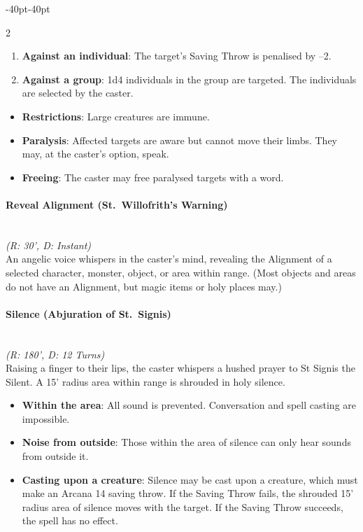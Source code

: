 \documentclass{book}
\providecommand{\tightlist}{%
\setlength{\itemsep}{0pt}\setlength{\parskip}{0pt}}
\begin{document}
\begin{adjustwidth}{-40pt}{-40pt}
\begin{multicols}{2}
\begin{enumerate}
	\def\labelenumi{\arabic{enumi}.}
	\tightlist
	\item
	\textbf{Against an individual}: The target's Saving Throw is penalised
	by --2.
	\item
	\textbf{Against a group}: 1d4 individuals in the group are targeted.
	The individuals are selected by the caster.
\end{enumerate}

\begin{itemize}
	\tightlist
	\item
	\textbf{Restrictions}: Large creatures are immune.
	\item
	\textbf{Paralysis}: Affected targets are aware but cannot move their
	limbs. They may, at the caster's option, speak.
	\item
	\textbf{Freeing}: The caster may free paralysed targets with a word.
\end{itemize}

\paragraph{Reveal Alignment (St.~Willofrith's
	Warning)}\label{reveal-alignment-st.-willofriths-warning}\mbox{}\\
\emph{(R: 30', D: Instant)}\\
An angelic voice whispers in the caster's mind, revealing the Alignment
of a selected character, monster, object, or area within range. (Most
objects and areas do not have an Alignment, but magic items or holy
places may.)

\paragraph{Silence (Abjuration of
	St.~Signis)}\label{silence-abjuration-of-st.-signis}\mbox{}\\
\emph{(R: 180', D: 12 Turns)}\\
Raising a finger to their lips, the caster whispers a hushed prayer to
St Signis the Silent. A 15' radius area within range is shrouded in holy
silence.

\begin{itemize}
	\tightlist
	\item
	\textbf{Within the area}: All sound is prevented. Conversation and
	spell casting are impossible.
	\item
	\textbf{Noise from outside}: Those within the area of silence can only
	hear sounds from outside it.
	\item
	\textbf{Casting upon a creature}: Silence may be cast upon a creature,
	which must make an Arcana 14 saving throw. If the Saving Throw fails,
	the shrouded 15' radius area of silence moves with the target. If the
	Saving Throw succeeds, the spell has no effect.
\end{itemize}


\end{multicols}
\end{adjustwidth}
\end{document}
